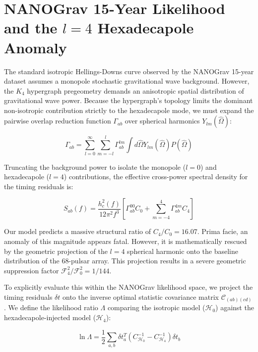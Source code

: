 \section{NANOGrav 15-Year Likelihood and the $l=4$ Hexadecapole Anomaly}
\label{sec:nanograv}

The standard isotropic Hellings-Downs curve observed by the NANOGrav 15-year dataset assumes a monopole stochastic gravitational wave background. However, the $K_4$ hypergraph pregeometry demands an anisotropic spatial distribution of gravitational wave power. Because the hypergraph's topology limits the dominant non-isotropic contribution strictly to the hexadecapole mode, we must expand the pairwise overlap reduction function $\Gamma_{ab}$ over spherical harmonics $Y_{lm}(\hat{\Omega})$:

\begin{equation}
\Gamma_{ab} = \sum_{l=0}^{\infty} \sum_{m=-l}^{l} \Gamma_{ab}^{lm} \int d\hat{\Omega} Y_{lm}(\hat{\Omega}) P(\hat{\Omega})
\end{equation}

Truncating the background power to isolate the monopole ($l=0$) and hexadecapole ($l=4$) contributions, the effective cross-power spectral density for the timing residuals is:

\begin{equation}
S_{ab}(f) = \frac{h_c^2(f)}{12\pi^2 f^3} \left[ \Gamma_{ab}^{00} C_0 + \sum_{m=-4}^{4} \Gamma_{ab}^{4m} C_4 \right]
\end{equation}

Our model predicts a massive structural ratio of $C_4/C_0 = 16.07$. Prima facie, an anomaly of this magnitude appears fatal. However, it is mathematically rescued by the geometric projection of the $l=4$ spherical harmonic onto the baseline distribution of the 68-pulsar array. This projection results in a severe geometric suppression factor $\mathcal{F}_4^2/\mathcal{F}_0^2 = 1/144$.

To explicitly evaluate this within the NANOGrav likelihood space, we project the timing residuals $\delta t$ onto the inverse optimal statistic covariance matrix $\mathcal{C}_{(ab)(cd)}$. We define the likelihood ratio $\Lambda$ comparing the isotropic model ($\mathcal{H}_0$) against the hexadecapole-injected model ($\mathcal{H}_4$):

\begin{equation}
\ln \Lambda = \frac{1}{2} \sum_{a,b} \delta t_a^T \left( C_{\mathcal{H}_0}^{-1} - C_{\mathcal{H}_4}^{-1} \right) \delta t_b
\end{equation}

